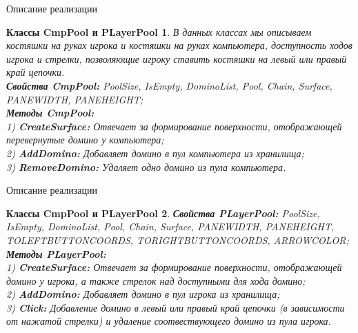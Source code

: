 \documentclass[handout]{beamer}
\newtheorem*{classes6}{Классы CmpPool и PLayerPool}
\begin{document}
  	\begin{frame}{Описание реализации}
  	\begin{classes6}
В данных классах мы описываем костяшки на руках игрока и костяшки на руках компьютера, доступность ходов игрока и стрелки, позволяющие игроку ставить костяшки на левый или правый край цепочки.\\
    \textbf{Свойства CmpPool:} PoolSize, IsEmpty, DominoList, Pool, Chain, Surface, PANEWIDTH, PANEHEIGHT;\\
	\textbf{Методы CmpPool:}\\
	 1) \textbf{CreateSurface:} Отвечает за формирование поверхности, отображающей перевернутые домино у компьютера;\\
	 2) \textbf{AddDomino:} Добавляет домино в пул компьютера из хранилища;\\
	 3) \textbf{RemoveDomino:} Удаляет одно домино из пула компьютера.\\		
  	\end{classes6}
  \end{frame}

\begin{frame}{Описание реализации}
	\begin{classes6}
		 \textbf{Свойства PLayerPool:} PoolSize, IsEmpty, DominoList, Pool, Chain, Surface, PANEWIDTH, PANEHEIGHT, TOLEFTBUTTONCOORDS, TORIGHTBUTTONCOORDS, ARROWCOLOR;\\
		\textbf{Методы PLayerPool:}\\
		1) \textbf{CreateSurface:} Отвечает за формирование поверхности, отображающей домино у игрока, а также стрелок над доступными для хода домино;\\
		2) \textbf{AddDomino:} Добавляет домино в пул игрока из хранилища;\\
		3) \textbf{Click:} Добавление домино в левый или правый край цепочки (в зависимости от нажатой стрелки) и удаление соотвествующего домино из пула игрока.\\
		
	\end{classes6}
\end{frame}
  
\end{document}
